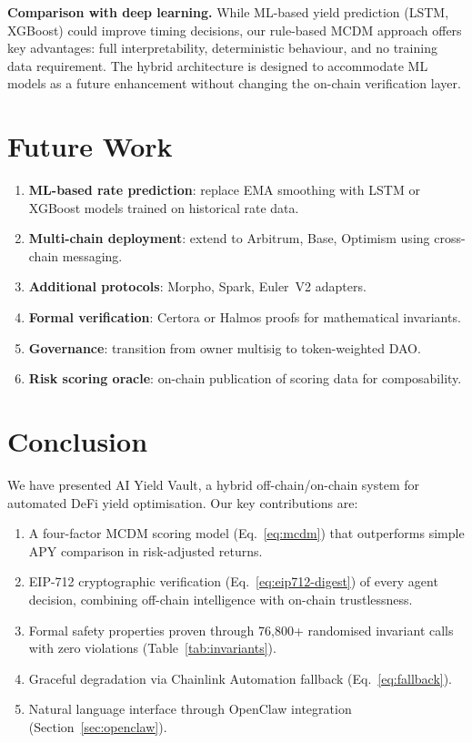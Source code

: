 \documentclass[12pt]{article}
\begin{document}
\textbf{Comparison with deep learning.}
While ML-based yield prediction (LSTM, XGBoost) could improve timing decisions, our rule-based MCDM approach offers key advantages: full interpretability, deterministic behaviour, and no training data requirement.
The hybrid architecture is designed to accommodate ML models as a future enhancement without changing the on-chain verification layer.

\section{Future Work}

\begin{enumerate}[nosep]
  \item \textbf{ML-based rate prediction}: replace EMA smoothing with LSTM or XGBoost models trained on historical rate data.
  \item \textbf{Multi-chain deployment}: extend to Arbitrum, Base, Optimism using cross-chain messaging.
  \item \textbf{Additional protocols}: Morpho, Spark, Euler~V2 adapters.
  \item \textbf{Formal verification}: Certora or Halmos proofs for mathematical invariants.
  \item \textbf{Governance}: transition from owner multisig to token-weighted DAO.
  \item \textbf{Risk scoring oracle}: on-chain publication of scoring data for composability.
\end{enumerate}

\section{Conclusion}

We have presented AI Yield Vault, a hybrid off-chain/on-chain system for automated DeFi yield optimisation.
Our key contributions are:
\begin{enumerate}[nosep]
  \item A four-factor MCDM scoring model (Eq.~\ref{eq:mcdm}) that outperforms simple APY comparison in risk-adjusted returns.
  \item EIP-712 cryptographic verification (Eq.~\ref{eq:eip712-digest}) of every agent decision, combining off-chain intelligence with on-chain trustlessness.
  \item Formal safety properties proven through 76{,}800+ randomised invariant calls with zero violations (Table~\ref{tab:invariants}).
  \item Graceful degradation via Chainlink Automation fallback (Eq.~\ref{eq:fallback}).
  \item Natural language interface through OpenClaw integration (Section~\ref{sec:openclaw}).
\end{enumerate}
\end{document}
